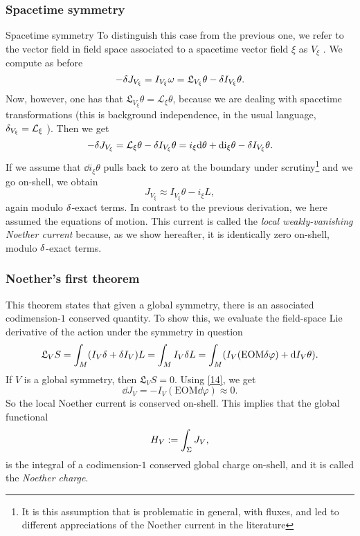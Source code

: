 \subsubsection*{Spacetime symmetry}
Spacetime symmetry To distinguish this case from the previous one, we refer to the vector field in field space associated to a spacetime vector field $\xi$ as $V_\xi $ . We compute as before
\begin{equation}\label{15}
	-\d J_{V_\xi }=I_{V_\xi }\omega=\mathfrak{L}_{V_\xi }\theta-\d I_{V_\xi }\theta.
\end{equation}
Now, however, one has that $\mathfrak{L}_{V_\xi }\theta=\mathcal{L}_\xi \theta$, because we are dealing with spacetime transformations
(this is background independence, in the usual language, $\d_{V_\xi}=\mathcal{L}_\xi $ ). Then we get
\begin{equation}\label{16}
	-\d J_{V_\xi }=\mathcal{L}_\xi \theta-\d I_{V_\xi }\theta=i_\xi \dd \theta+\dd\i_\xi \theta-\d I_{V_\xi }\theta.
\end{equation}
If we assume that $\dd i_\xi \theta$ pulls back to zero at the boundary under scrutiny\footnote{It is this assumption that is problematic in general, with fluxes, and led to different appreciations of the Noether current in the literature} and we go on-shell, we obtain
\begin{equation}\label{17}
	J_{V_\xi }\approx I_{V_\xi }\theta-i_\xi L,
\end{equation}
again modulo $\d $-exact terms. In contrast to the previous derivation, we here assumed the equations of motion. This current is called the \textit{local weakly-vanishing Noether current} because, as we show hereafter, it is identically zero on-shell, modulo $\d $-exact terms.

\subsubsection*{Noether's first theorem}
This theorem states that given a global symmetry, there is an associated codimension-$1$ conserved quantity. To show this, we evaluate the field-space Lie derivative of the action under the symmetry in question
\begin{equation}\label{18}
	\mathfrak{L}_VS=\int_M(I_V\d +\d I_V)L=\int_M I_V\d L=\int_M(I_V(\text{EOM}\d\varphi)+\dd I_V\theta).
\end{equation}
If $V$ is a global symmetry, then $\mathfrak{L}_VS=0$. Using \eqref{14}, we get
\begin{equation}\label{19}
	\dd J_V=-I_V(\text{EOM}\dd\varphi)\approx 0.
\end{equation}
So the local Noether current is conserved on-shell. This implies that the global functional
\begin{equation}\label{20}
	H_V:=\int_\S J_V,
\end{equation}
is the integral of a codimension-$1$ conserved global charge on-shell, and it is called the \textit{Noether charge}.

